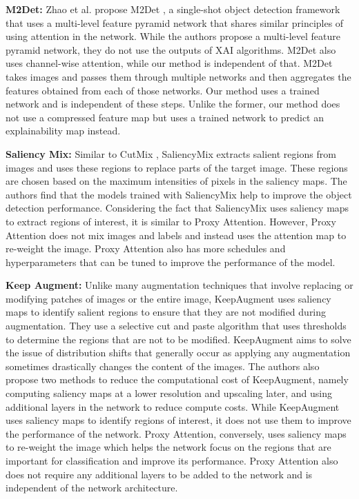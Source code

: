\textbf{M2Det: }
Zhao et al. propose M2Det \cite{zhaoM2DetSingleShotObject2019}, a single-shot object detection framework that uses a multi-level feature pyramid network that shares similar principles of using attention in the network. While the authors propose a multi-level feature pyramid network, they do not use the outputs of XAI algorithms. M2Det also uses channel-wise attention, while our method is independent of that. M2Det takes images and passes them through multiple networks and then aggregates the features obtained from each of those networks. Our method uses a trained network and is independent of these steps. Unlike the former, our method does not use a compressed feature map but uses a trained network to predict an explainability map instead.

\textbf{Saliency Mix: }
Similar to CutMix \cite{yunCutMixRegularizationStrategy2019}, SaliencyMix \cite{uddinSaliencyMixSaliencyGuided2021} extracts salient regions from images and uses these regions to replace parts of the target image. These regions are chosen based on the maximum intensities of pixels in the saliency maps. The authors find that the models trained with SaliencyMix help to improve the object detection performance. Considering the fact that SaliencyMix uses saliency maps to extract regions of interest, it is similar to Proxy Attention. However, Proxy Attention does not mix images and labels and instead uses the attention map to re-weight the image. Proxy Attention also has more schedules and hyperparameters that can be tuned to improve the performance of the model.

\textbf{Keep Augment: }
Unlike many augmentation techniques that involve replacing or modifying patches of images or the entire image, KeepAugment \cite{gongKeepAugmentSimpleInformationPreserving2021} uses saliency maps to identify salient regions to ensure that they are not modified during augmentation. They use a selective cut and paste algorithm that uses thresholds to determine the regions that are not to be modified. KeepAugment aims to solve the issue of distribution shifts that generally occur as applying any augmentation sometimes drastically changes the content of the images. The authors also propose two methods to reduce the computational cost of KeepAugment, namely computing saliency maps at a lower resolution and upscaling later, and using additional layers in the network to reduce compute costs. While KeepAugment uses saliency maps to identify regions of interest, it does not use them to improve the performance of the network. Proxy Attention, conversely, uses saliency maps to re-weight the image which helps the network focus on the regions that are important for classification and improve its performance. Proxy Attention also does not require any additional layers to be added to the network and is independent of the network architecture.

